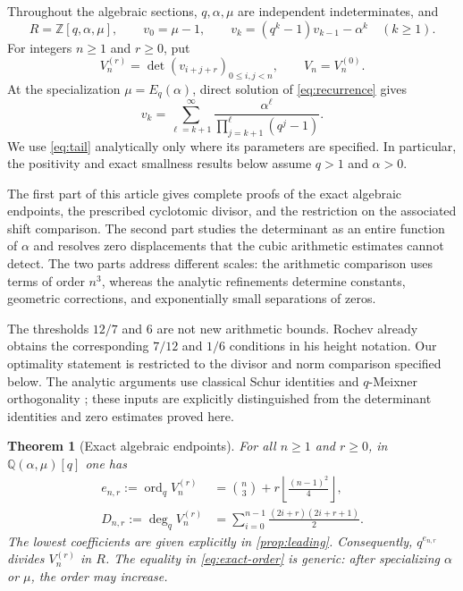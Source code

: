 \documentclass[11pt]{article}
\numberwithin{equation}{section}
\newtheorem{theorem}{Theorem}[section]
\theoremstyle{definition}
\theoremstyle{remark}
\newcommand{\Q}{\mathbb{Q}}
\newcommand{\Z}{\mathbb{Z}}
\newcommand{\ordq}{\operatorname{ord}_q}
\newcommand{\degq}{\operatorname{deg}_q}
\newcommand{\fl}[1]{\left\lfloor#1\right\rfloor}
\begin{document}
Throughout the algebraic sections, $q,\alpha,\mu$ are independent
indeterminates, and
\begin{equation}\label{eq:recurrence}
 R=\Z[q,\alpha,\mu],\qquad
 v_0=\mu-1,\qquad v_k=(q^k-1)v_{k-1}-\alpha^k\quad(k\ge1).
\end{equation}
For integers $n\ge1$ and $r\ge0$, put
\begin{equation}\label{eq:hankel}
 V_n^{(r)}=\det(v_{i+j+r})_{0\le i,j<n},\qquad V_n=V_n^{(0)}.
\end{equation}
At the specialization $\mu=E_q(\alpha)$, direct solution of
\eqref{eq:recurrence} gives
\begin{equation}\label{eq:tail}
 v_k=\sum_{\ell=k+1}^{\infty}
 \frac{\alpha^\ell}{\prod_{j=k+1}^{\ell}(q^j-1)}.
\end{equation}
We use \eqref{eq:tail} analytically only where its parameters are specified.
In particular, the positivity and exact smallness results below assume
$q>1$ and $\alpha>0$.

The first part of this article gives complete proofs of the exact algebraic
endpoints, the prescribed cyclotomic divisor, and the restriction on the
associated shift comparison. The second part studies the determinant as an
entire function of $\alpha$ and resolves zero displacements that the cubic
arithmetic estimates cannot detect. The two parts address different scales:
the arithmetic comparison uses terms of order $n^3$, whereas the analytic
refinements determine constants, geometric corrections, and exponentially
small separations of zeros.

The thresholds $12/7$ and $6$ are not new arithmetic bounds. Rochev
\cite[Corollary 1.1]{Rochev2011} already obtains the corresponding
$7/12$ and $1/6$ conditions in his height notation. Our optimality statement
is restricted to the divisor and norm comparison specified below.
The analytic arguments use classical Schur identities \cite{Macdonald}
and $q$-Meixner orthogonality \cite{KS}; these inputs are explicitly
distinguished from the determinant identities and zero estimates proved here.

\begin{theorem}[Exact algebraic endpoints]\label{thm:main-algebra}
For all $n\ge1$ and $r\ge0$, in $\Q(\alpha,\mu)[q]$ one has
\begin{align}
 e_{n,r}:=\ordq V_n^{(r)}
 &=\binom n3+r\fl{\frac{(n-1)^2}{4}},\label{eq:exact-order}\\
 D_{n,r}:=\degq V_n^{(r)}
 &=\sum_{i=0}^{n-1}\frac{(2i+r)(2i+r+1)}2.\label{eq:exact-degree}
\end{align}
The lowest coefficients are given explicitly in \cref{prop:leading}.
Consequently, $q^{e_{n,r}}$ divides $V_n^{(r)}$ in $R$.
The equality in \eqref{eq:exact-order} is generic: after specializing
$\alpha$ or $\mu$, the order may increase.
\end{theorem}
\end{document}

